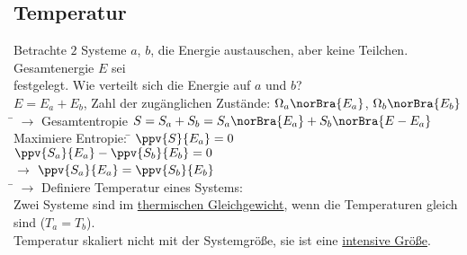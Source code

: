 \subsection{Temperatur}
\label{sec:Temperatur}
\begin{tabbing}
Betrachte $2$ Systeme $a$, $b$, die Energie austauschen, aber keine Teilchen. Gesamtenergie $E$ sei\\ festgelegt. Wie verteilt sich die Energie auf $a$ und $b$?\\
$E = E_a + E_b$, Zahl der zugänglichen Zustände: $\Omega_a\norBra{E_a}$, $\Omega_b\norBra{E_b}$\\
\hspace{4em} \= \kill
$\rightarrow$\> Gesamtentropie $S = S_a + S_b = S_a\norBra{E_a} + S_b\norBra{E-E_a}$\\
Maximiere Entropie: \= $\ppv{S}{E_a} = 0$\\
\> $\ppv{S_a}{E_a} - \ppv{S_b}{E_b} = 0$\\
\> $\rightarrow$ $\ppv{S_a}{E_a} = \ppv{S_b}{E_b}$\\
\hspace{4em} \= \kill
$\rightarrow$\> Definiere Temperatur eines Systems: \\
Zwei Systeme sind im \uline{thermischen Gleichgewicht}, wenn die Temperaturen gleich sind ($T_a = T_b$).\\
Temperatur skaliert nicht mit der Systemgröße, sie ist eine \uline{intensive Größe}.
\end{tabbing}

